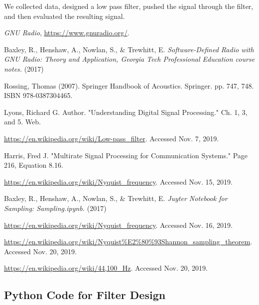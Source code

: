 We collected data, designed a low pass filter, pushed the signal
through the filter, and then evaluated the resulting signal.







\begin{thebibliography}{1}

\emph{GNU Radio}, \url{https://www.gnuradio.org/}.

Baxley, R., Henshaw, A., Nowlan, S., \& Trewhitt, E. \emph{Software-Defined Radio with GNU Radio: Theory and Application, Georgia Tech Professional Education course notes.} (2017)

Rossing, Thomas (2007). Springer Handbook of Acoustics. Springer. pp. 747, 748. ISBN 978-0387304465.

Lyons, Richard G. Author. "Understanding Digital Signal Processing."  Ch. 1, 3, and 5. Web.

\url{https://en.wikipedia.org/wiki/Low-pass_filter}.  Accessed Nov. 7, 2019.

Harris, Fred J. "Multirate Signal Processing for Communication Systems." Page 216, Equation 8.16.

\url{https://en.wikipedia.org/wiki/Nyquist_frequency}.  Accessed Nov. 15, 2019.

Baxley, R., Henshaw, A., Nowlan, S., \& Trewhitt, E. \emph{Juyter Notebook for Sampling: Sampling.ipynb.} (2017)

\url{https://en.wikipedia.org/wiki/Nyquist_frequency}.  Accessed Nov. 16, 2019.

\url{https://en.wikipedia.org/wiki/Nyquist\%E2\%80\%93Shannon_sampling_theorem}.  Accessed Nov. 20, 2019.

\url{https://en.wikipedia.org/wiki/44,100_Hz}. Accessed Nov. 20, 2019.

\end{thebibliography}


\newpage


\onecolumn
\appendix 

\subsection{Python Code for Filter Design\cite{notes:class}}






